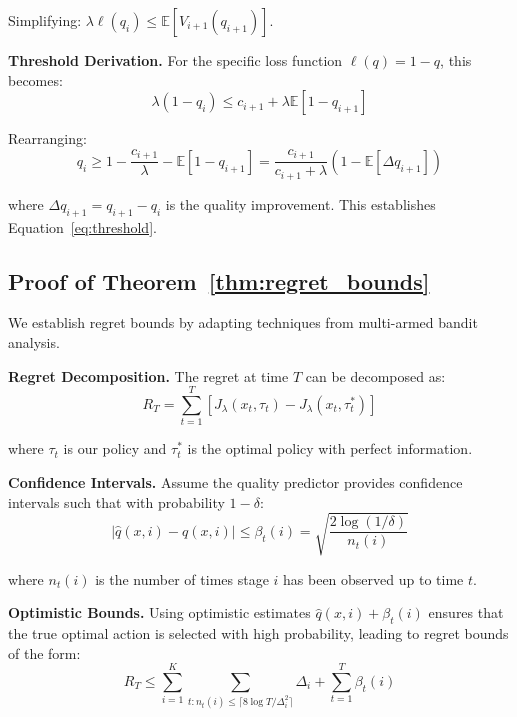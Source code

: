 \documentclass{article}
\theoremstyle{plain}
\theoremstyle{definition}
\theoremstyle{remark}
\begin{document}
Simplifying: $\lambda \ell(q_i) \leq \mathbb{E}[V_{i+1}(q_{i+1})]$.

\textbf{Threshold Derivation.} For the specific loss function $\ell(q) = 1 - q$, this becomes:
\begin{equation}
\lambda (1 - q_i) \leq c_{i+1} + \lambda \mathbb{E}[1 - q_{i+1}]
\end{equation}

Rearranging:
\begin{equation}
q_i \geq 1 - \frac{c_{i+1}}{\lambda} - \mathbb{E}[1 - q_{i+1}] = \frac{c_{i+1}}{c_{i+1} + \lambda}(1 - \mathbb{E}[\Delta q_{i+1}])
\end{equation}

where $\Delta q_{i+1} = q_{i+1} - q_i$ is the quality improvement. This establishes Equation~\eqref{eq:threshold}.

\subsection{Proof of Theorem~\ref{thm:regret_bounds}}

We establish regret bounds by adapting techniques from multi-armed bandit analysis.

\textbf{Regret Decomposition.} The regret at time $T$ can be decomposed as:
\begin{equation}
R_T = \sum_{t=1}^T \left[J_\lambda(x_t, \tau_t) - J_\lambda(x_t, \tau_t^*)\right]
\end{equation}

where $\tau_t$ is our policy and $\tau_t^*$ is the optimal policy with perfect information.

\textbf{Confidence Intervals.} Assume the quality predictor provides confidence intervals such that with probability $1-\delta$:
\begin{equation}
|\hat{q}(x, i) - q(x, i)| \leq \beta_t(i) = \sqrt{\frac{2\log(1/\delta)}{n_t(i)}}
\end{equation}

where $n_t(i)$ is the number of times stage $i$ has been observed up to time $t$.

\textbf{Optimistic Bounds.} Using optimistic estimates $\hat{q}(x, i) + \beta_t(i)$ ensures that the true optimal action is selected with high probability, leading to regret bounds of the form:
\begin{equation}
R_T \leq \sum_{i=1}^K \sum_{t: n_t(i) \leq \lceil 8\log T / \Delta_i^2 \rceil} \Delta_i + \sum_{t=1}^T \beta_t(i)
\end{equation}
\end{document}
